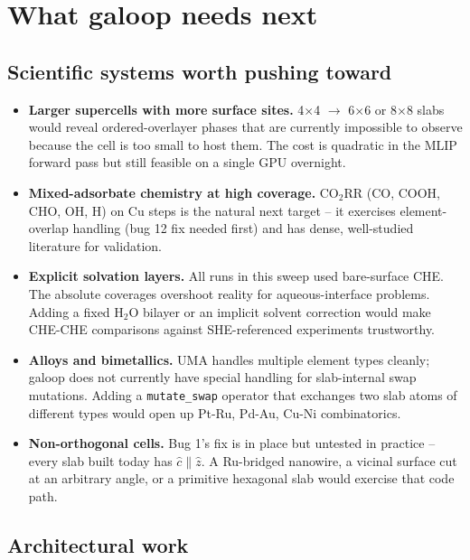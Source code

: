\documentclass[11pt,a4paper]{article}
\begin{document}
\section{What galoop needs next}
\label{sec:forward}

\subsection{Scientific systems worth pushing toward}

\begin{itemize}
  \item \textbf{Larger supercells with more surface sites.} 4$\times$4
    $\to$ 6$\times$6 or 8$\times$8 slabs would reveal ordered-overlayer
    phases that are currently impossible to observe because the cell
    is too small to host them. The cost is quadratic in the MLIP
    forward pass but still feasible on a single GPU overnight.
  \item \textbf{Mixed-adsorbate chemistry at high coverage.} CO$_2$RR
    (CO, COOH, CHO, OH, H) on Cu steps is the natural next target --
    it exercises element-overlap handling (bug 12 fix needed first)
    and has dense, well-studied literature for validation.
  \item \textbf{Explicit solvation layers.} All runs in this sweep
    used bare-surface CHE. The absolute coverages overshoot reality
    for aqueous-interface problems. Adding a fixed H$_2$O bilayer
    or an implicit solvent correction would make CHE-CHE comparisons
    against SHE-referenced experiments trustworthy.
  \item \textbf{Alloys and bimetallics.} UMA handles multiple element
    types cleanly; galoop does not currently have special handling
    for slab-internal swap mutations. Adding a \texttt{mutate\_swap}
    operator that exchanges two slab atoms of different types would
    open up Pt-Ru, Pd-Au, Cu-Ni combinatorics.
  \item \textbf{Non-orthogonal cells.} Bug 1's fix is in place but
    untested in practice -- every slab built today has
    $\hat{c} \parallel \hat{z}$. A Ru-bridged nanowire, a vicinal
    surface cut at an arbitrary angle, or a primitive hexagonal
    slab would exercise that code path.
\end{itemize}

\subsection{Architectural work}
\end{document}
